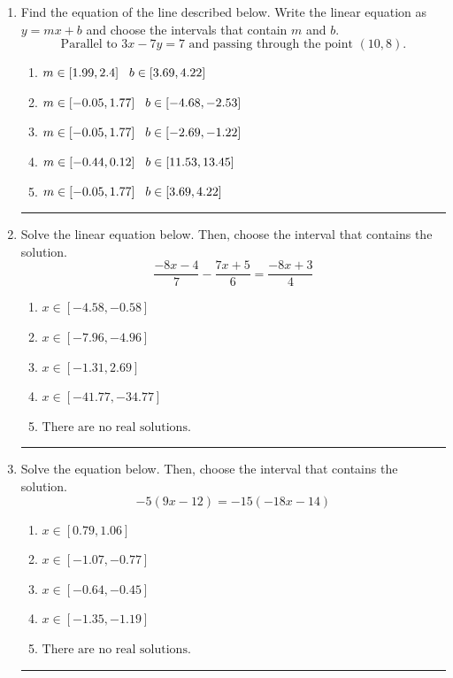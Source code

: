 \documentclass[14pt]{extbook}
\newcommand{\litem}[1]{\item#1\hspace*{-1cm}\rule{\textwidth}{0.4pt}}
\begin{document}
\begin{enumerate}
\litem{
Find the equation of the line described below. Write the linear equation as $ y=mx+b $ and choose the intervals that contain $m$ and $b$.\[ \text{Parallel to } 3 x - 7 y = 7 \text{ and passing through the point } (10, 8). \]\begin{enumerate}[label=\Alph*.]
\item \( m \in [1.99, 2.4] \hspace*{3mm} b \in [3.69, 4.22] \)
\item \( m \in [-0.05, 1.77] \hspace*{3mm} b \in [-4.68, -2.53] \)
\item \( m \in [-0.05, 1.77] \hspace*{3mm} b \in [-2.69, -1.22] \)
\item \( m \in [-0.44, 0.12] \hspace*{3mm} b \in [11.53, 13.45] \)
\item \( m \in [-0.05, 1.77] \hspace*{3mm} b \in [3.69, 4.22] \)

\end{enumerate} }
\litem{
Solve the linear equation below. Then, choose the interval that contains the solution.\[ \frac{-8x -4}{7} - \frac{7x + 5}{6} = \frac{-8x + 3}{4} \]\begin{enumerate}[label=\Alph*.]
\item \( x \in [-4.58, -0.58] \)
\item \( x \in [-7.96, -4.96] \)
\item \( x \in [-1.31, 2.69] \)
\item \( x \in [-41.77, -34.77] \)
\item \( \text{There are no real solutions.} \)

\end{enumerate} }
\litem{
Solve the equation below. Then, choose the interval that contains the solution.\[ -5(9x -12) = -15(-18x -14) \]\begin{enumerate}[label=\Alph*.]
\item \( x \in [0.79, 1.06] \)
\item \( x \in [-1.07, -0.77] \)
\item \( x \in [-0.64, -0.45] \)
\item \( x \in [-1.35, -1.19] \)
\item \( \text{There are no real solutions.} \)


\end{enumerate}}
\end{enumerate}
\end{document}
